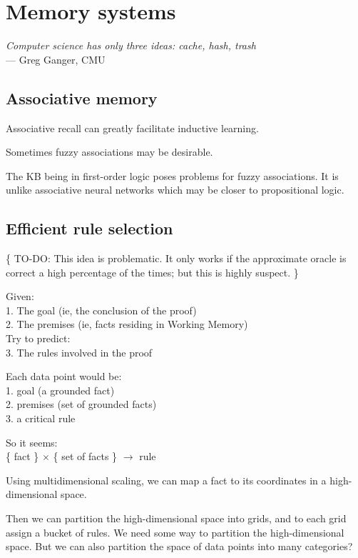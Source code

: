 \chapter{Memory systems}
\begin{flushright}
\emph{Computer science has only three ideas: cache, hash, trash}\\ --- Greg Ganger, CMU
\end{flushright}
\minitoc

\section{Associative memory}
\label{sec:associative-memory}

Associative recall can greatly facilitate inductive learning.

Sometimes fuzzy associations may be desirable.

The KB being in first-order logic poses problems for fuzzy associations.  It is unlike associative neural networks which may be closer to propositional logic.

\section{Efficient rule selection}
\label{sec:EfficientRuleSelection}

\{ TO-DO:  This idea is problematic.  It only works if the approximate oracle is correct a high percentage of the times;  but this is highly suspect.  \}

Given:\\
1. The goal (ie, the conclusion of the proof)\\
2. The premises (ie, facts residing in Working Memory)\\
Try to predict:\\
3. The rules involved in the proof

Each data point would be:\\
1.  goal (a grounded fact)\\
2.  premises (set of grounded facts)\\
3.  a critical rule

So it seems:\\
\{ fact \} $\times$ \{ set of facts \} $\rightarrow$ rule

Using multidimensional scaling, we can map a fact to its coordinates in a high-dimensional space.

Then we can partition the high-dimensional space into grids, and to each grid assign a bucket of rules.  We need some way to partition the high-dimensional space.  But we can also partition the space of data points into many categories?
